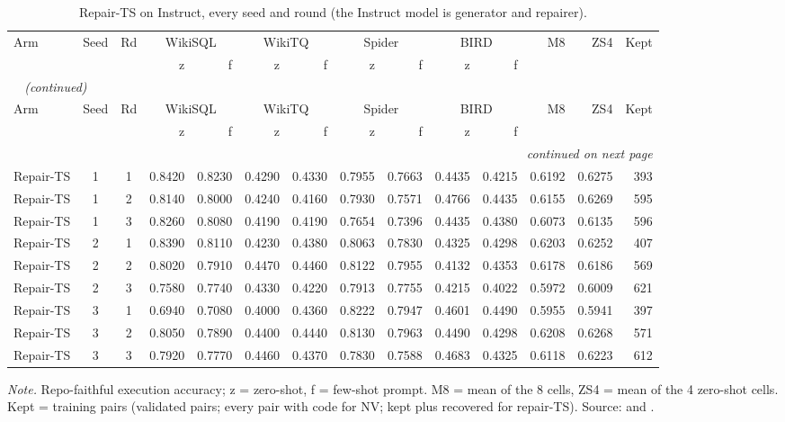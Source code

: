 {\small
{}
\setlength{\tabcolsep}{4.2pt}
\begin{longtable}{@{}lccrrrrrrrrrrr@{}}
\caption{Repair-TS on Instruct, every seed and round (the Instruct model is generator and repairer).}\label{tab:gen-perseed_repair_instruct}\\
\toprule
\rowcolor{headshade}Arm & Seed & Rd & \multicolumn{2}{c}{WikiSQL} & \multicolumn{2}{c}{WikiTQ} & \multicolumn{2}{c}{Spider} & \multicolumn{2}{c}{BIRD} & M8 & ZS4 & Kept\\\rowcolor{headshade} & & & z & f & z & f & z & f & z & f & & &\\
\midrule
\endfirsthead
\multicolumn{14}{l}{\textit{\tablename~\thetable{} (continued)}}\\
\toprule
\rowcolor{headshade}Arm & Seed & Rd & \multicolumn{2}{c}{WikiSQL} & \multicolumn{2}{c}{WikiTQ} & \multicolumn{2}{c}{Spider} & \multicolumn{2}{c}{BIRD} & M8 & ZS4 & Kept\\\rowcolor{headshade} & & & z & f & z & f & z & f & z & f & & &\\
\midrule
\endhead
\midrule
\multicolumn{14}{r}{\textit{continued on next page}}\\
\endfoot
\bottomrule
\endlastfoot
Repair-TS & 1 & 1 & 0.8420 & 0.8230 & 0.4290 & 0.4330 & 0.7955 & 0.7663 & 0.4435 & 0.4215 & 0.6192 & 0.6275 & 393\\
Repair-TS & 1 & 2 & 0.8140 & 0.8000 & 0.4240 & 0.4160 & 0.7930 & 0.7571 & 0.4766 & 0.4435 & 0.6155 & 0.6269 & 595\\
Repair-TS & 1 & 3 & 0.8260 & 0.8080 & 0.4190 & 0.4190 & 0.7654 & 0.7396 & 0.4435 & 0.4380 & 0.6073 & 0.6135 & 596\\
Repair-TS & 2 & 1 & 0.8390 & 0.8110 & 0.4230 & 0.4380 & 0.8063 & 0.7830 & 0.4325 & 0.4298 & 0.6203 & 0.6252 & 407\\
Repair-TS & 2 & 2 & 0.8020 & 0.7910 & 0.4470 & 0.4460 & 0.8122 & 0.7955 & 0.4132 & 0.4353 & 0.6178 & 0.6186 & 569\\
Repair-TS & 2 & 3 & 0.7580 & 0.7740 & 0.4330 & 0.4220 & 0.7913 & 0.7755 & 0.4215 & 0.4022 & 0.5972 & 0.6009 & 621\\
Repair-TS & 3 & 1 & 0.6940 & 0.7080 & 0.4000 & 0.4360 & 0.8222 & 0.7947 & 0.4601 & 0.4490 & 0.5955 & 0.5941 & 397\\
Repair-TS & 3 & 2 & 0.8050 & 0.7890 & 0.4400 & 0.4440 & 0.8130 & 0.7963 & 0.4490 & 0.4298 & 0.6208 & 0.6268 & 571\\
Repair-TS & 3 & 3 & 0.7920 & 0.7770 & 0.4460 & 0.4370 & 0.7830 & 0.7588 & 0.4683 & 0.4325 & 0.6118 & 0.6223 & 612\\
\end{longtable}
}
\vspace{-0.6\baselineskip}
{\footnotesize\color{slate}\textit{Note.} Repo-faithful execution accuracy; z = zero-shot, f = few-shot prompt. M8 = mean of the 8 cells, ZS4 = mean of the 4 zero-shot cells. Kept = training pairs (validated pairs; every pair with code for NV; kept plus recovered for repair-TS). Source:  and .\par}
\medskip
